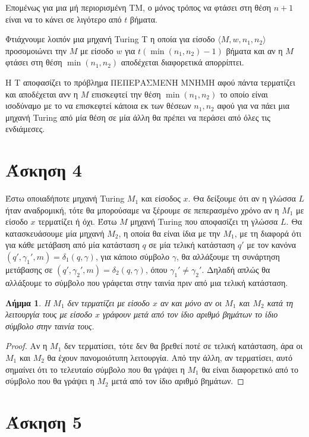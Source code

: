 \documentclass[a4paper, oneside, 11pt]{article}
\newtheorem{lm}[thm]{Λήμμα}
\theoremstyle{definition}
\begin{document}
Επομένως για μια μή περιορισμένη TM, ο μόνος τρόπος να φτάσει στη θέση $n+1$ είναι να
το κάνει σε λιγότερο από $t$ βήματα.

Φτιάχνουμε λοιπόν μια μηχανή Turing T η οποία για είσοδο $\langle M, w, n_1, n_2
\rangle$ προσομοιώνει την $M$ με είσοδο $w$ για $t(\min(n_1, n_2)-1)$ βήματα και αν η
$M$ φτάσει στη θέση $\min(n_1, n_2)$ αποδέχεται διαφορετικά απορρίπτει.

Η T αποφασίζει το πρόβλημα ΠΕΠΕΡΑΣΜΕΝΗ ΜΝΗΜΗ αφού πάντα τερματίζει και αποδέχεται ανν
η $M$ επισκεφτεί την θέση $\min(n_1, n_2)$ το οποίο είναι ισοδύναμο με το να
επισκεφτεί κάποια εκ των θέσεων $n_1, n_2$ αφού για να πάει μια μηχανή Turing από μία
θέση σε μία άλλη θα πρέπει να περάσει από όλες τις ενδιάμεσες.

\section*{Άσκηση 4}

Έστω οποιαδήποτε μηχανή Turing $M_1$ και είσοδος $x$. Θα δείξουμε ότι αν η γλώσσα $L$ ήταν αναδρομική,
τότε θα μπορούσαμε να ξέρουμε σε πεπερασμένο χρόνο αν η $M_1$ με είσοδο $x$ τερματίζει ή όχι.
Έστω $M$ μηχανή Turing που αποφασίζει τη γλώσσα $L$. Θα κατασκευάσουμε μία μηχανή $M_2$, η οποία θα είναι
ίδια με την $M_1$, με τη διαφορά ότι για κάθε μετάβαση από μία κατάσταση $q$ σε μία τελική κατάσταση $q'$ 
με τον κανόνα $(q',\gamma_1',m)=\delta_1(q,\gamma)$, για κάποιο σύμβολο $\gamma$, θα αλλάξουμε τη συνάρτηση
μετάβασης σε $(q',\gamma_2',m)=\delta_2(q,\gamma)$, όπου $\gamma_1'\neq \gamma_2'$. Δηλαδή απλώς θα αλλάξουμε το σύμβολο που γράφεται
στην ταινία πριν από μια τελική κατάσταση.
\begin{lm}
Η $M_1$ δεν τερματίζει με είσοδο $x$ αν και μόνο αν οι $M_1$ και $M_2$ κατά τη λειτουργία τους με είσοδο
$x$ γράφουν μετά από τον ίδιο αριθμό βημάτων το ίδιο σύμβολο στην ταινία τους.
\end{lm}
\begin{proof}
Αν η $M_1$ δεν τερματίσει, τότε δεν θα βρεθεί ποτέ σε τελική κατάσταση, άρα οι $M_1$ και $M_2$ θα έχουν 
πανομοιότυπη λειτουργία.
Από την άλλη, αν τερματίσει, αυτό σημαίνει ότι το τελευταίο σύμβολο που θα γράψει η $M_1$ θα είναι 
διαφορετικό από το σύμβολο που θα γράψει η $M_2$ μετά από τον ίδιο αριθμό βημάτων.
\end{proof}

\section*{Άσκηση 5}
\end{document}
